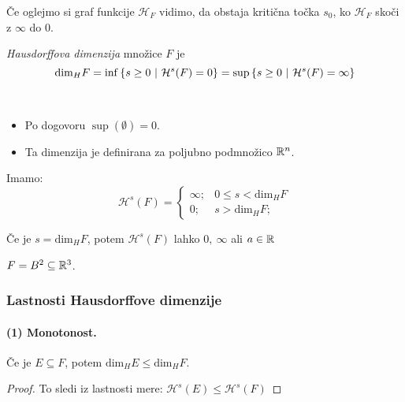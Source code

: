 Če oglejmo si graf funkcije \(\mathcal{H}_F\) vidimo, da obstaja kritična točka \(s_0\), ko \(\mathcal{H}_F\) skoči z \(\infty\) do \(0\).

\begin{definicija}
    \emph{Hausdorffova dimenzija} množice \(F\) je 
    \[\text{dim}_H F = \inf \left\{s \geq 0 \ | \ \mathcal{H}^{s}(F) = 0\right\} = \sup \left\{s \geq 0 \ | \ \mathcal{H}^{s}(F) = \infty\right\}\]
\end{definicija}

\begin{opomba} \
    \begin{itemize}
        \item Po dogovoru \(\sup (\emptyset) = 0\).
        \item Ta dimenzija je definirana za poljubno podmnožico \(\mathbb{R}^n\).
    \end{itemize}    
\end{opomba}

Imamo:
\[
    \mathcal{H}^{s}(F) = \begin{cases}
        \infty; &0 \leq s < \text{dim}_H F \\ 
        0; &s > \text{dim}_H F;
    \end{cases}
\]

Če je \(s = \text{dim}_H F\), potem \(\mathcal{H}^{s}(F)\) lahko \(0, \  \infty\) ali \(a \in \mathbb{R}\)

\begin{primer}
    \(F = B^2 \subseteq \mathbb{R}^3\). \todo{}
\end{primer}

\newpage
\subsubsection*{Lastnosti Hausdorffove dimenzije}
\paragraph{(1) Monotonost.} Če je \(E \subseteq F\), potem \(\text{dim}_H E \leq \text{dim}_H F\).
\begin{proof}
    To sledi iz lastnosti mere: \(\mathcal{H}^{s}(E) \leq \mathcal{H}^{s}(F)\)
\end{proof}

